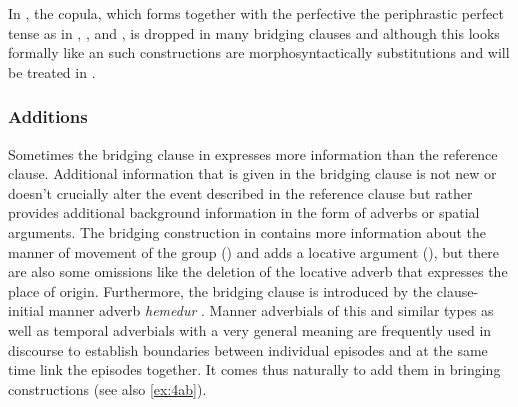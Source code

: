 \documentclass[output=paper]{LSP/langsci}
\begin{document}
In , the copula, which forms together with the perfective  the periphrastic perfect tense as in , , and , is dropped in many bridging clauses and although this looks formally like an  such constructions are morphosyntactically substitutions and will be treated in .  

\subsubsection{Additions}
\label{ssec:Additions}
Sometimes the bridging clause in  expresses more information than the reference clause. Additional information that is given in the bridging clause is not new or doesn't crucially alter the event described in the reference clause but rather provides additional background information in the form of adverbs or spatial arguments. 
The bridging construction in  contains more information about the manner of movement of the group () and adds a locative argument (), but there are also some omissions like the deletion of the locative adverb that expresses the place of origin. Furthermore, the bridging clause is introduced by the clause-initial manner adverb \textit{hemedur} . Manner adverbials of this and similar types as well as temporal adverbials with a very general meaning are frequently used in  discourse to establish boundaries between individual episodes and at the same time link the episodes together. It comes thus naturally to add them in bringing constructions (see also \ref{ex:4ab}).
\end{document}
